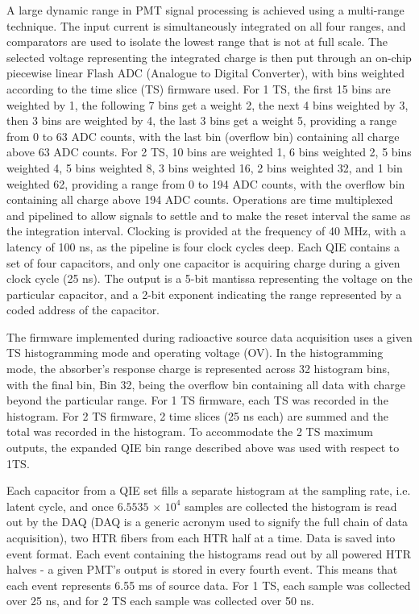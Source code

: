 A large dynamic range in PMT signal processing is achieved using
a multi-range technique. The input current is simultaneously integrated on all
four ranges, and comparators are used to isolate the lowest range that is not at
full scale. The selected voltage representing the integrated charge is then put
through an on-chip piecewise linear Flash ADC (Analogue to Digital Converter),
with bins weighted according to the time slice (TS) firmware used. For 1 TS, the first 15 bins are weighted by 1, the following 7 bins get a weight 2, the next 4 bins weighted by 3, then 3 bins are weighted by 4, the last 3 bins get a weight 5, providing a range from 0 to 63 ADC counts, with the last
bin (overflow bin) containing all charge above 63 ADC counts. For 2 TS, 10 bins
are weighted 1, 6 bins weighted 2, 5 bins weighted 4, 5 bins weighted 8, 3 bins
weighted 16, 2 bins weighted 32, and 1 bin weighted 62, providing a range from
0 to 194 ADC counts, with the overflow bin containing all charge above 194 ADC
counts. Operations are time multiplexed and pipelined to allow signals to
settle and to make the reset interval the same as the integration interval.
Clocking is provided at the frequency of 40 MHz, with a latency of
100 ns, as the pipeline is four clock cycles deep. Each QIE contains a
set of four capacitors, and only one capacitor is acquiring charge during a
given clock cycle (25 ns). The output is a 5-bit mantissa representing the voltage on
the particular capacitor, and a 2-bit exponent indicating the range
represented by a coded address of the capacitor.

The firmware implemented during radioactive source data acquisition uses a
given TS histogramming mode and operating voltage (OV). In the histogramming
mode, the absorber's response charge is represented across 32 histogram bins,
with the final bin, Bin 32, being the overflow bin containing all data with
charge beyond the particular range. For 1 TS firmware, each TS was recorded in
the histogram. For 2 TS firmware, 2 time slices (25 ns each) are summed and the total was recorded in the histogram. To accommodate
the 2 TS maximum outputs, the expanded QIE bin range described above was used
with respect to 1TS.

Each capacitor from a QIE set fills a separate histogram at the sampling rate,
i.e. latent cycle, and once $6.5535$ $\times$ $10^4$ samples are collected the histogram
is read out by the DAQ (DAQ is a generic acronym used to signify the full chain of data acquisition), two HTR fibers from each HTR half at a time. Data is
saved into event format. Each event containing the histograms read out by all powered HTR
halves - a given PMT's output is stored in every fourth event. This means
that each event represents 6.55 ms of source data. For 1 TS, each sample
was collected over 25 ns, and for 2 TS each sample was collected over
50 ns.